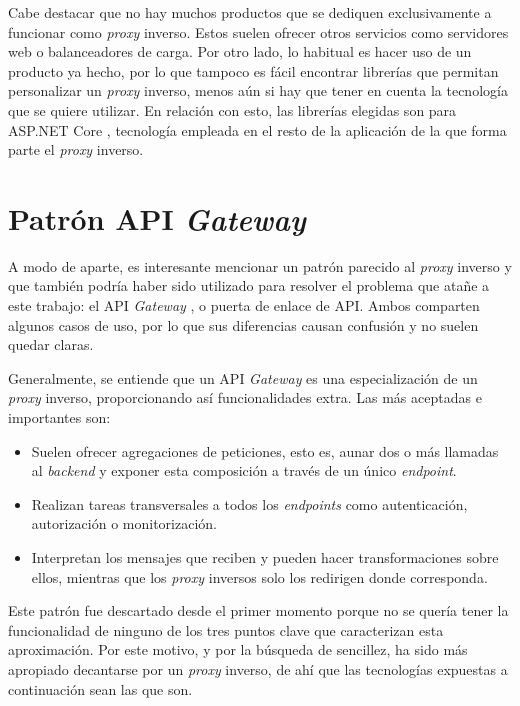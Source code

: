 \documentclass[11pt,spanish,listoffigures]{tfgetsinf}
\begin{document}
Cabe destacar que no hay muchos productos que se dediquen exclusivamente a funcionar como \emph{proxy} inverso. Estos suelen ofrecer otros servicios como servidores web o balanceadores de carga. Por otro lado, lo habitual es hacer uso de un producto ya hecho, por lo que tampoco es fácil encontrar librerías que permitan personalizar un \emph{proxy} inverso, menos aún si hay que tener en cuenta la tecnología que se quiere utilizar. En relación con esto, las librerías elegidas son para ASP.NET Core \cite{DotNetCore}, tecnología empleada en el resto de la aplicación de la que forma parte el \emph{proxy} inverso.


	\section{Patrón API \emph{Gateway}}

A modo de aparte, es interesante mencionar un patrón parecido al \emph{proxy} inverso y que también podría haber sido utilizado para resolver el problema que atañe a este trabajo: el API \emph{Gateway} \cite{ApiGateway}, o puerta de enlace de API. Ambos comparten algunos casos de uso, por lo que sus diferencias causan confusión y no suelen quedar claras.

Generalmente, se entiende que un API \emph{Gateway} es una especialización de un \emph{proxy} inverso, proporcionando así funcionalidades extra. Las más aceptadas e importantes son:

\begin{itemize}
	
	\item Suelen ofrecer agregaciones de peticiones, esto es, aunar dos o más llamadas al \emph{backend} y exponer esta composición a través de un único \emph{endpoint}.
	
	\item Realizan tareas transversales a todos los \emph{endpoints} como autenticación, autorización o monitorización.

	\item Interpretan los mensajes que reciben y pueden hacer transformaciones sobre ellos, mientras que los \emph{proxy} inversos solo los redirigen donde corresponda.

\end{itemize}

Este patrón fue descartado desde el primer momento porque no se quería tener la funcionalidad de ninguno de los tres puntos clave que caracterizan esta aproximación. Por este motivo, y por la búsqueda de sencillez, ha sido más apropiado decantarse por un \emph{proxy} inverso, de ahí que las tecnologías expuestas a continuación sean las que son.
\end{document}
